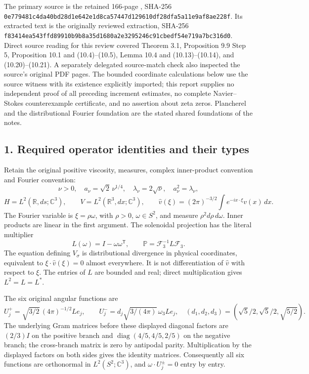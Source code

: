 The primary source is the retained 166-page , SHA-256 \texttt{0e779481\allowbreak{}c4da40bd\allowbreak{}28d1e642\allowbreak{}e1d8ca57\allowbreak{}447d1296\allowbreak{}10df28df\allowbreak{}a5a11e9a\allowbreak{}f8ae228f}. Its extracted text is the originally reviewed extraction, SHA-256 \texttt{f83414ea\allowbreak{}543ffd89\allowbreak{}910b9b8a\allowbreak{}35d1680a\allowbreak{}2e329524\allowbreak{}6c91cbed\allowbreak{}f54e719a\allowbreak{}7bc316d0}. Direct source reading for this review covered Theorem 3.1, Proposition 9.9 Step 5, Proposition 10.1 and (10.4)--(10.5), Lemma 10.4 and (10.13)--(10.14), and (10.20)--(10.21). A separately delegated source-match check also inspected the source's original PDF pages. The bounded coordinate calculations below use the source witness with its existence explicitly imported; this report supplies no independent proof of all preceding increment estimates, no complete Navier--Stokes counterexample certificate, and no assertion about zeta zeros. Plancherel and the distributional Fourier foundation are the stated shared foundations of the notes.

\subsection*{1. Required operator identities and their types}

Retain the original positive viscosity, measures, complex inner-product convention and Fourier convention: \[
\nu>0,\quad a_\nu=\sqrt2\,\nu^{1/4},\quad
\lambda_\nu=2\sqrt\nu,\quad a_\nu^2=\lambda_\nu,
\] \[
H=L^2(\mathbb R,ds;\mathbb C^3),\qquad
V=L^2(\mathbb R^3,dx;\mathbb C^3),\qquad
\widehat v(\xi)=(2\pi)^{-3/2}\int e^{-ix\cdot\xi}v(x)\,dx.
\] The Fourier variable is \(\xi=\rho\omega\), with \(\rho>0\), \(\omega\in S^2\), and measure \(\rho^2d\rho\,d\omega\). Inner products are linear in the first argument. The solenoidal projection has the literal multiplier \[
L(\omega)=I-\omega\omega^{\mathsf T},\qquad
\mathbb P=\mathcal F_3^{-1}L\mathcal F_3.
\] The equation defining \(V_\sigma\) is distributional divergence in physical coordinates, equivalent to \(\xi\cdot\widehat v(\xi)=0\) almost everywhere. It is not differentiation of \(\widehat v\) with respect to \(\xi\). The entries of \(L\) are bounded and real; direct multiplication gives \(L^2=L=L^*\).

The six original angular functions are \[
U_j^+=\sqrt{3/2}\,(4\pi)^{-1/2}Le_j,
\qquad
U_j^-=d_j\sqrt{3/(4\pi)}\,\omega_3Le_j,
\quad(d_1,d_2,d_3)=(\sqrt5/2,\sqrt5/2,\sqrt{5/2}).
\] The underlying Gram matrices before these displayed diagonal factors are \((2/3)I\) on the positive branch and \(\operatorname{diag}(4/5,4/5,2/5)\) on the negative branch; the cross-branch matrix is zero by antipodal parity. Multiplication by the displayed factors on both sides gives the identity matrices. Consequently all six functions are orthonormal in \(L^2(S^2;\mathbb C^3)\), and \(\omega\cdot U_j^\pm=0\) entry by entry.

